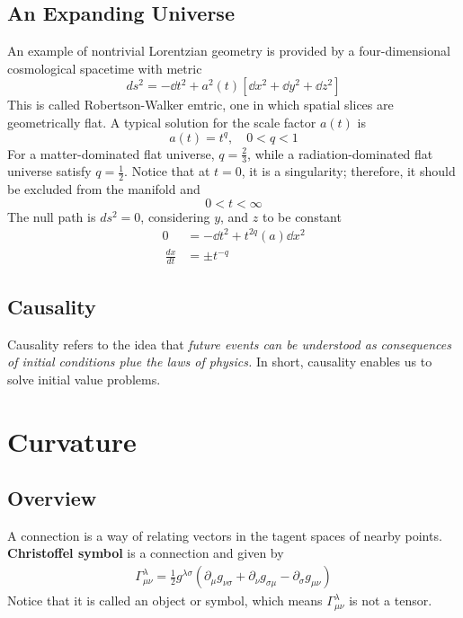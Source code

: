 \documentclass[11pt]{article}
\theoremstyle{definition}
\numberwithin{equation}{section}
\begin{document}
\subsection{An Expanding Universe}
An example of nontrivial Lorentzian geometry is provided by a four-dimensional cosmological spacetime with metric
\begin{equation}
    ds^2=-\dd t^2+a^2(t)[\dd x^2+ \dd y^2 +\dd z^2]
\end{equation}
This is called Robertson-Walker emtric, one in which spatial slices are geometrically flat. A typical solution for the scale factor $a(t)$ is
\begin{equation}
    a(t)=t^q, \quad 0<q<1
\end{equation}
For a matter-dominated flat universe, $q=\frac{2}{3}$, while a radiation-dominated flat universe satisfy $q=\frac{1}{2}$. Notice that at $t=0$, it is a singularity; therefore, it should be excluded from the manifold and
\begin{equation}
    0<t<\infty
\end{equation}
The null path is $ds^2=0$, considering $y$, and $z$ to be constant
\begin{equation}
    \begin{aligned}
        0&=-\dd t^2+t^{2q}(a)\dd x^2\\\
        \frac{dx}{dt} &= \pm t^{-q}
    \end{aligned}
\end{equation}

\subsection{Causality}
Causality refers to the idea that \textit{future events can be understood as consequences of initial conditions plue the laws of physics.} In short, causality enables us to solve initial value problems.


\section{Curvature}
\subsection{Overview}
A connection is a way of relating vectors in the tagent spaces of nearby points. \textbf{Christoffel symbol} is a connection and given by 
\begin{align*}
    \Gamma^\lambda_{\mu\nu}=\frac{1}{2}g^{\lambda\sigma}(\partial_\mu g_{\nu\sigma}+\partial_\nu g_{\sigma\mu}-\partial_\sigma g_{\mu\nu})
\end{align*}
Notice that it is called an object or symbol, which means $\Gamma^\lambda_{\mu\nu}$ is not a tensor.
\end{document}
